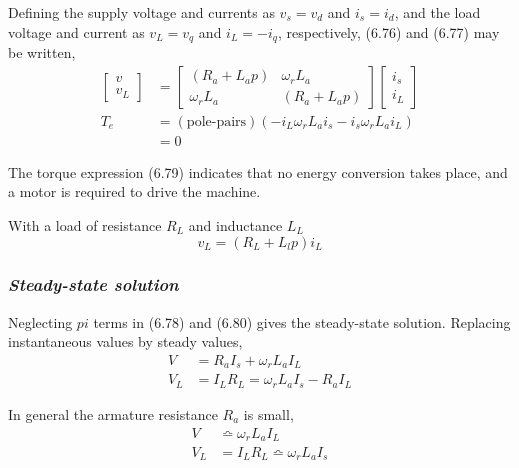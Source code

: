 \documentclass[a4paper,numbers=noenddot,12pt]{scrbook}
\begin{document}
Defining the supply voltage and currents as $v_s = v_d$ and $i_s = i_d$, and the load voltage and current as $v_L = v_q$ and $i_L = -i_q$, respectively, (6.76) and (6.77) may be written,
\begin{align}
    \begin{bmatrix}
        v \\ v_L
    \end{bmatrix}
    & = 
    \begin{bmatrix}
        (R_a + L_a p) & \omega_r L_a \\
        \omega_r L_a & (R_a + L_a p)
    \end{bmatrix}
    \begin{bmatrix}
        i_s \\ i_L
    \end{bmatrix} \\
    T_e & = (\text{pole-pairs})(- i_L \omega_r L_a i_s - i_s \omega_r L_a i_L)\\
    & = 0 \nonumber
    \label{eq:Eq6.79}
\end{align}

The torque expression (6.79) indicates that no energy conversion takes place, and a motor is required to drive the machine.

With a load of resistance $R_L$ and inductance $L_L$
\begin{equation}
    v_L = (R_L + L_l p)i_L
    \label{eq_Eq6.80}
\end{equation}

\subsubsection{\textit{Steady-state solution}}
Neglecting $p i$ terms in (6.78) and (6.80) gives the steady-state solution. Replacing instantaneous values by steady values,
\begin{equation}
    \begin{aligned}
        V  & = R_a I_s + \omega_r L_ a I_L \\
        V_L & = I_L R_L = \omega_r L_a I_s - R_a I_L
    \end{aligned}
    \label{eq:Eq6.81}
\end{equation}

In general the armature resistance $R_a$ is small,
\begin{equation}
    \begin{aligned}
        V & \bumpeq \omega_r L_a I_L \\
        V_ L & =I_L R_L \bumpeq \omega_r L_a I_s 
    \end{aligned}
    \label{eq_Eq6.82}
\end{equation}
\end{document}
